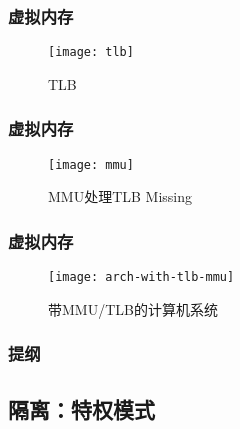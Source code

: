 \begin{frame}
	
	\frametitle{虚拟内存}
	
	\begin{figure}
		\centering
		\texttt{[image: tlb]}
		\caption{TLB}
	\end{figure}
	
\end{frame}

\begin{frame}[plain]
	
	\frametitle{虚拟内存}
	
	\begin{figure}
		\centering
		\texttt{[image: mmu]}
		\caption{MMU处理TLB Missing}
	\end{figure}
	
\end{frame}

\begin{frame}[plain]
	
	\frametitle{虚拟内存}
	
	\begin{figure}
		\centering
		\texttt{[image: arch-with-tlb-mmu]}
		\caption{带MMU/TLB的计算机系统}
	\end{figure}
	
\end{frame}

\begin{frame}
    \frametitle{提纲} 
    \tableofcontents 
\end{frame}

\subsection{隔离：特权模式}

